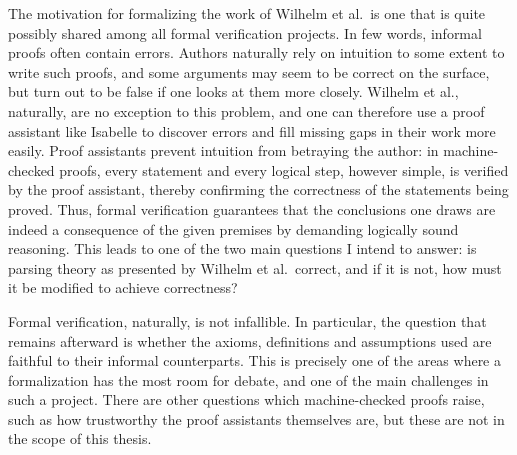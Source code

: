 \begin{isabellebody}
\begin{isamarkuptext}
The motivation for formalizing the work of Wilhelm et al.\ is one that is quite possibly shared among
all formal verification projects. In few words, informal proofs often contain errors.
Authors naturally rely on intuition to some extent to write
such proofs, and some arguments may seem to be correct on the surface, but turn out to be false if
one looks at them more closely. Wilhelm et al., naturally, are no exception to this problem, and one
can therefore use a proof assistant like Isabelle to discover errors and fill missing gaps in their
work more easily. Proof assistants prevent intuition from betraying the author: in machine-checked
proofs, every statement and every logical step, however simple, is verified by the proof assistant,
thereby confirming the correctness of the statements being proved. Thus, formal verification
guarantees that the conclusions one draws are indeed a consequence of the given premises by demanding 
logically sound reasoning. This leads to one of the two main questions I intend to answer: is 
parsing theory as presented by Wilhelm et al.\ correct, and if it is not, how must it be modified to
achieve correctness?

Formal verification, naturally, is not infallible. In particular, the question that remains afterward
is whether the axioms, definitions and assumptions used are faithful to their informal counterparts.
This is precisely one of the areas where a formalization has the most room for debate, and one of
the main challenges in such a project. There are other questions which machine-checked proofs raise,
such as how trustworthy the proof assistants themselves are, but these are not in the scope of this
thesis.


\end{isamarkuptext}
\end{isabellebody}
